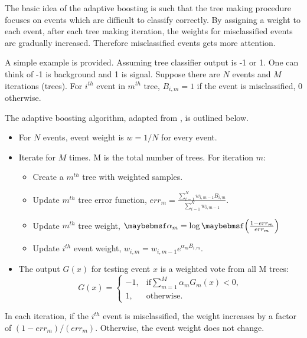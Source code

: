 The basic idea of the adaptive boosting is such that the tree making procedure focuses on events which are difficult to classify correctly. By assigning a weight to each event,   after each tree making iteration, the weights for misclassified events are gradually increased. Therefore misclassified events gets more attention.

A simple example is provided. Assuming tree classifier output is -1 or 1. One can think of -1 is background and 1 is signal. Suppose there are $N$ events and $M$ iterations (trees). For $i^{th}$ event in $m^{th}$ tree,  $B_{i,m} = 1$ if the event is misclassified, 0 otherwise.

The adaptive boosting algorithm, adapted from \cite{hastie2009elements},  is outlined below.

\begin{itemize}
  \item For $N$ events, event weight is $w = 1 / N$ for every event.
  \item Iterate for $M$ times. M is the total number of trees. For iteration $m$:
    \begin{itemize}
      \item Create a $m^{th}$ tree  with weighted samples.
      \item Update $m^{th}$ tree error function, $err_m = \frac{\sum_{i = 1}^{N} w_{i,m-1} B_{i,m} }{\sum_{i = 1}^{N}w_{i,m-1}}$.
      \item Update $m^{th}$ tree weight,  $\alpha_m = \log\parenths{\frac{1 - err_m}{err_m}}$
      \item Update $i^{th}$ event weight, $w_{i,m} = w_{i,m-1} e^{\alpha_m B_{i,m} }$.
    \end{itemize}
  \item The output $G(x)$ for testing event $x$ is a weighted vote from all M trees:
  \begin{equation}
    G(x)=
     \begin{cases}
      -1, & \mbox{if} \sum_{m=1}^{M}\alpha_mG_m(x) < 0 , \\
      1, & \mbox{otherwise}.
    \end{cases}
  \end{equation}
\end{itemize}

In each iteration, if the $i^{th}$ event is misclassified, the weight increases by a factor of $(1 - err_m)/(err_m)$. Otherwise, the event weight does not change.

